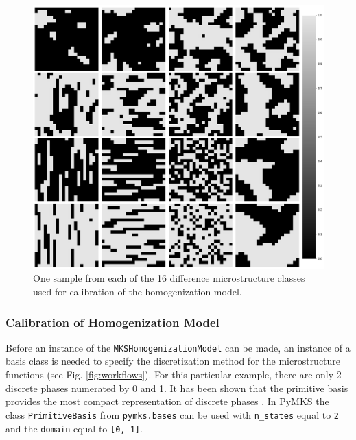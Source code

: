 \documentclass{bmcart}
\newcommand{\fimage}
{\fcolorbox{outcolor}{white}}
{}
\begin{document}
\begin{figure}
    \centering
    \includegraphics[scale=.28]{pymks_paper_homogenization_files/pymks_paper_homogenization_5_0.png}
    \caption{One sample from each of the 16 difference microstructure classes used for calibration of the homogenization model.}
    \label{fig:drawMicro}
\end{figure}

    \subsubsection{Calibration of Homogenization
Model}\label{calibration-of-homogenization-model}

Before an instance of the \texttt{MKSHomogenizationModel} can be made,
an instance of a basis class is needed to specify the discretization
method for the microstructure functions (see Fig. \ref{fig:workflows}).
For this particular example, there are only 2 discrete phases numerated
by 0 and 1. It has been shown that the primitive basis provides the most
compact representation of discrete phases \cite{niezgoda2013novel,niezgoda2011understanding,niezgoda2010optimized,
cecen2016versatile,cceccen2014data,landi2010multi,landi2010multi,
al2012multi}. In PyMKS the class
\texttt{PrimitiveBasis} from \texttt{pymks.bases} can be used with
\texttt{n\_states} equal to \texttt{2} and the \texttt{domain} equal to
\texttt{{[}0,\ 1{]}}.
\end{document}
